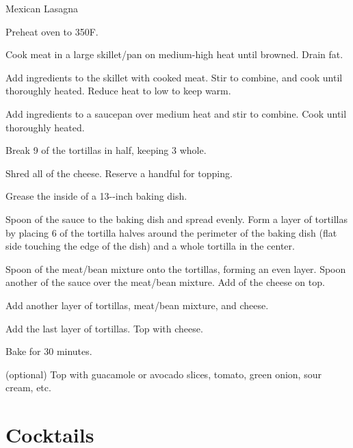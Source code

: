 \documentclass[]{article}
\begin{document}
\begin{recipe}{Mexican Lasagna}{}{}
	
	
	Preheat oven to 350\0F.
	
	Cook meat in a large skillet/pan on medium-high heat until browned. Drain fat.
	
	Add ingredients to the skillet with cooked meat. Stir to combine, and cook until thoroughly heated. Reduce heat to low to keep warm.
	
	Add ingredients to a saucepan over medium heat and stir to combine. Cook until thoroughly heated. 
	
	Break 9 of the tortillas in half, keeping 3 whole.
	
	Shred all of the cheese. Reserve a handful for topping. 
	
	\newstep
	Grease the inside of a 13--inch baking dish.
	
	\newstep
	Spoon  of the sauce to the baking dish and spread evenly. Form a layer of tortillas by placing 6 of the tortilla halves around the perimeter of the baking dish (flat side touching the edge of the dish) and a whole tortilla in the center.
	
	\newstep
	Spoon  of the meat/bean mixture onto the tortillas, forming an even layer. Spoon another  of the sauce over the meat/bean mixture. Add  of the cheese on top.
	
	\newstep
	Add another layer of tortillas, meat/bean mixture, and cheese.
	
	\newstep
	Add the last layer of tortillas. Top with cheese.
	
	\newstep
	Bake for 30 minutes. 
	
	\newstep
	(optional) Top with guacamole or avocado slices, tomato, green onion, sour cream, etc.
	
\end{recipe}

\newpage

\section{Cocktails}
\end{document}
